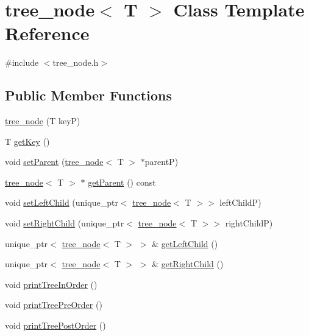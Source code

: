 \hypertarget{classtree__node}{}\section{tree\+\_\+node$<$ T $>$ Class Template Reference}
\label{classtree__node}


{\ttfamily \#include $<$tree\+\_\+node.\+h$>$}

\subsection*{Public Member Functions}
\begin{DoxyCompactItemize}
\item 
\hyperlink{classtree__node_a776da4de6a1faef8b984f8b6dfe6eb6a}{tree\+\_\+node} (T keyP)
\item 
T \hyperlink{classtree__node_afbe2d91ad009570338290ed9eb8a7485}{get\+Key} ()
\item 
void \hyperlink{classtree__node_a1fe75baae3a5d9caa9cb886c54c291e2}{set\+Parent} (\hyperlink{classtree__node}{tree\+\_\+node}$<$ T $>$ $\ast$parentP)
\item 
\hyperlink{classtree__node}{tree\+\_\+node}$<$ T $>$ $\ast$ \hyperlink{classtree__node_aa17e609b57f77bb5446d83c964409ac4}{get\+Parent} () const
\item 
void \hyperlink{classtree__node_a3db979969a0fe8505ba65c7afabb5463}{set\+Left\+Child} (unique\+\_\+ptr$<$ \hyperlink{classtree__node}{tree\+\_\+node}$<$ T $>$$>$ left\+ChildP)
\item 
void \hyperlink{classtree__node_afea4c6595dafba65b5c4e59ca3da30f3}{set\+Right\+Child} (unique\+\_\+ptr$<$ \hyperlink{classtree__node}{tree\+\_\+node}$<$ T $>$$>$ right\+ChildP)
\item 
unique\+\_\+ptr$<$ \hyperlink{classtree__node}{tree\+\_\+node}$<$ T $>$ $>$ \& \hyperlink{classtree__node_ae161b70a3780e0cb3ecd4b57acc9e2d1}{get\+Left\+Child} ()
\item 
unique\+\_\+ptr$<$ \hyperlink{classtree__node}{tree\+\_\+node}$<$ T $>$ $>$ \& \hyperlink{classtree__node_a5e584d47f2c11941fe0406836fe50159}{get\+Right\+Child} ()
\item 
void \hyperlink{classtree__node_ae87818a195621d4defc1cde67e7219ee}{print\+Tree\+In\+Order} ()
\item 
void \hyperlink{classtree__node_a2ca4e1521e6620bbe2418a9636a109a8}{print\+Tree\+Pre\+Order} ()
\item 
void \hyperlink{classtree__node_a4bfdd2b618c15252fcfbeab46ca05861}{print\+Tree\+Post\+Order} ()

\end{DoxyCompactItemize}

